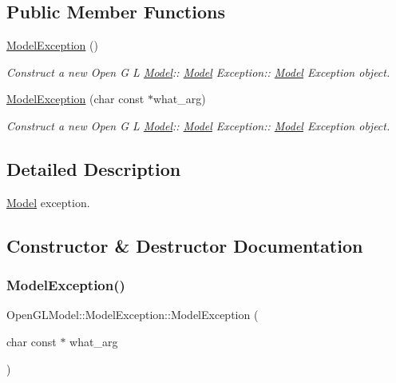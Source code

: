 \subsection*{Public Member Functions}
\begin{DoxyCompactItemize}
\item 
\mbox{\label{class_open_g_l_model_1_1_model_exception_a567efce262d3f104a37f3c8cfa75de84}} 
\hyperlink{class_open_g_l_model_1_1_model_exception_a567efce262d3f104a37f3c8cfa75de84}{Model\+Exception} ()
\begin{DoxyCompactList}\small\item\em Construct a new Open G L \hyperlink{class_model}{Model}\+:\+: \hyperlink{class_model}{Model} Exception\+:\+: \hyperlink{class_model}{Model} Exception object. \end{DoxyCompactList}\item 
\hyperlink{class_open_g_l_model_1_1_model_exception_ae146c9fc02c939d9572b106283673c6b}{Model\+Exception} (char const $\ast$what\+\_\+arg)
\begin{DoxyCompactList}\small\item\em Construct a new Open G L \hyperlink{class_model}{Model}\+:\+: \hyperlink{class_model}{Model} Exception\+:\+: \hyperlink{class_model}{Model} Exception object. \end{DoxyCompactList}\end{DoxyCompactItemize}


\subsection{Detailed Description}
\hyperlink{class_model}{Model} exception. 

\subsection{Constructor \& Destructor Documentation}
\mbox{\label{class_open_g_l_model_1_1_model_exception_ae146c9fc02c939d9572b106283673c6b}} 
\subsubsection{\texorpdfstring{Model\+Exception()}{ModelException()}}
{\footnotesize\ttfamily Open\+G\+L\+Model\+::\+Model\+Exception\+::\+Model\+Exception (\begin{DoxyParamCaption}\item[{char const $\ast$}]{what\+\_\+arg }\end{DoxyParamCaption})\hspace{0.3cm}{\ttfamily [explicit]}}



